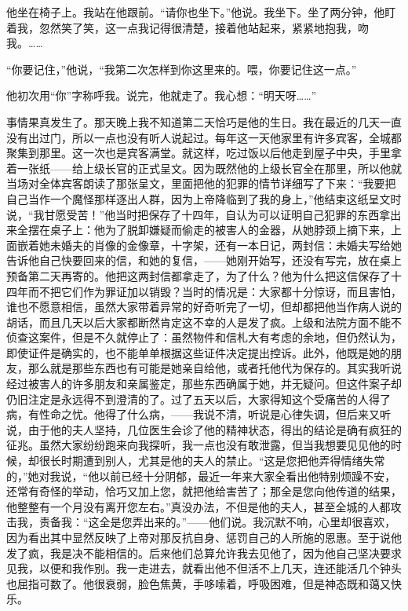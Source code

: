 \par 他坐在椅子上。我站在他跟前。“请你也坐下。”他说。我坐下。坐了两分钟，他盯着我，忽然笑了笑，这一点我记得很清楚，接着他站起来，紧紧地抱我，吻我。……
\par “你要记住，”他说，“我第二次怎样到你这里来的。喂，你要记住这一点。”
\par 他初次用“你”字称呼我。说完，他就走了。我心想：“明天呀……”
\par 事情果真发生了。那天晚上我不知道第二天恰巧是他的生日。我在最近的几天一直没有出过门，所以一点也没有听人说起过。每年这一天他家里有许多宾客，全城都聚集到那里。这一次也是宾客满堂。就这样，吃过饭以后他走到屋子中央，手里拿着一张纸——给上级长官的正式呈文。因为既然他的上级长官全在那里，所以他就当场对全体宾客朗读了那张呈文，里面把他的犯罪的情节详细写了下来：“我要把自己当作一个魔怪那样逐出人群，因为上帝降临到了我的身上，”他结束这纸呈文时说，“我甘愿受苦！”他当时把保存了十四年，自认为可以证明自己犯罪的东西拿出来全摆在桌子上：他为了脱卸嫌疑而偷走的被害人的金器，从她脖颈上摘下来，上面嵌着她未婚夫的肖像的金像章，十字架，还有一本日记，两封信：未婚夫写给她告诉他自己快要回来的信，和她的复信，——她刚开始写，还没有写完，放在桌上预备第二天再寄的。他把这两封信都拿走了，为了什么？他为什么把这信保存了十四年而不把它们作为罪证加以销毁？当时的情况是：大家都十分惊讶，而且害怕，谁也不愿意相信，虽然大家带着异常的好奇听完了一切，但却都把他当作病人说的胡话，而且几天以后大家都断然肯定这不幸的人是发了疯。上级和法院方面不能不侦查这案件，但是不久就停止了：虽然物件和信札大有考虑的余地，但仍然认为，即使证件是确实的，也不能单单根据这些证件决定提出控诉。此外，他既是她的朋友，那么就是那些东西也有可能是她亲自给他，或者托他代为保存的。其实我听说经过被害人的许多朋友和亲属鉴定，那些东西确属于她，并无疑问。但这件案子却仍旧注定是永远得不到澄清的了。过了五天以后，大家得知这个受痛苦的人得了病，有性命之忧。他得了什么病，——我说不清，听说是心律失调，但后来又听说，由于他的夫人坚持，几位医生会诊了他的精神状态，得出的结论是确有疯狂的征兆。虽然大家纷纷跑来向我探听，我一点也没有敢泄露，但当我想要见见他的时候，却很长时期遭到别人，尤其是他的夫人的禁止。“这是您把他弄得情绪失常的，”她对我说，“他以前已经十分阴郁，最近一年来大家全看出他特别烦躁不安，还常有奇怪的举动，恰巧又加上您，就把他给害苦了；那全是您向他传道的结果，他整整有一个月没有离开您左右。”真没办法，不但是他的夫人，甚至全城的人都攻击我，责备我：“这全是您弄出来的。”——他们说。我沉默不响，心里却很喜欢，因为看出其中显然反映了上帝对那反抗自身、惩罚自己的人所施的恩惠。至于说他发了疯，我是决不能相信的。后来他们总算允许我去见他了，因为他自己坚决要求见我，以便和我作别。我一走进去，就看出他不但活不上几天，连还能活几个钟头也屈指可数了。他很衰弱，脸色焦黄，手哆嗦着，呼吸困难，但是神态既和蔼又快乐。
